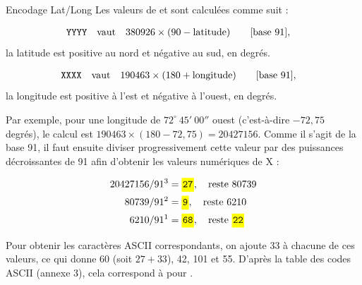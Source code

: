 \begin{aprssideblock}{Encodage Lat/Long}
Les valeurs de  et  sont calculées comme
suit :

\begin{align*}
\texttt{YYYY} &\quad\text{vaut}\quad
  380926 \times (90-\text{latitude}) \qquad \text{[base 91]},
\end{align*}
\hspace*{3.7em}la latitude est positive au nord et négative au sud, en degrés.

\begin{align*}
\texttt{XXXX} &\quad\text{vaut}\quad
  190463 \times (180+\text{longitude}) \qquad \text{[base 91]},
\end{align*}
\hspace*{3.7em}la longitude est positive à l'est et négative à l'ouest, en degrés.

Par exemple, pour une longitude de $72^{\circ}\ 45'\ 00''$ ouest
(c'est-à-dire $-72{,}75$ degrés), le calcul est
$190463\times(180-72{,}75)=20427156$. Comme il s'agit de la base 91, il faut
ensuite diviser progressivement cette valeur par des puissances décroissantes
de 91 afin d'obtenir les valeurs numériques de X :

\begin{align*}
20427156 / 91^3 &= \lit{27},\quad \text{reste }80739 \\
80739 / 91^2    &= \lit{9},\quad  \text{reste }6210 \\
6210 / 91^1     &= \lit{68},\quad \text{reste }\lit{22}
\end{align*}

Pour obtenir les caractères ASCII correspondants, on ajoute 33 à chacune de
ces valeurs, ce qui donne 60 (soit $27+33$), 42, 101 et 55. D'après la table
des codes ASCII (annexe 3), cela correspond à  pour
.
\end{aprssideblock}

